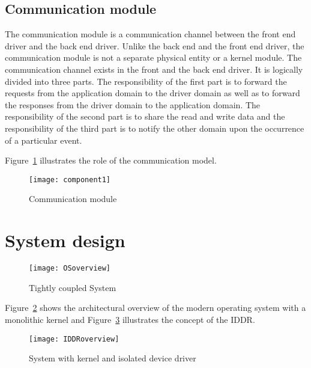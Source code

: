 \subsection{Communication module}
The communication module is a communication channel between the front end driver and the back end driver. Unlike the back end and the front end driver, the communication module is not a separate physical entity or a kernel module. The communication channel exists in the front and the back end driver. It is logically divided into three parts. The responsibility of the first part is to forward the requests from the application domain to the driver domain as well as to forward the responses from the driver domain to the application domain. The responsibility of the second part is to share the read and write data and the responsibility of the third part is to notify the other domain upon the occurrence of a particular event. 

Figure~\ref{fig:communication} illustrates the role of the communication model. 
\begin{figure}[!ht]
\centering
\texttt{[image: component1]}
\caption{Communication module}
\label{fig:communication}
\end{figure}
\pagebreak

\section{System design}\label{design}
\begin{figure}[!ht]
\centering
\texttt{[image: OSoverview]}
\caption{Tightly coupled System}
\label{fig:monolithic}
\end{figure}
Figure~\ref{fig:monolithic} shows the architectural overview of the modern operating system with a monolithic kernel and Figure~\ref{fig:isolated} illustrates the concept of the IDDR.
\begin{figure}[!ht]
\centering
\texttt{[image: IDDRoverview]}
\caption{System with kernel and isolated device driver}
\label{fig:isolated}
\end{figure}

